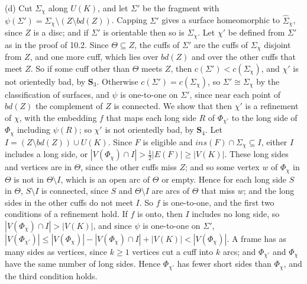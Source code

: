 {(d) Cut $\Sigma_\chi$ along $U(K)$, and let $\Sigma'$ be the fragment with $\psi(\Sigma') = \Sigma_\chi \setminus (Z \setminus bd(Z))$. Capping $\Sigma'$ gives a surface homeomorphic to $\hat{\Sigma}_\chi$, since $Z$ is a disc; and if $\Sigma'$ is orientable then so is $\Sigma_\chi$. Let $\chi'$ be defined from $\Sigma'$ as in the proof of 10.2. Since $\Theta \subseteq Z$, the cuffs of $\Sigma'$ are the cuffs of $\Sigma_\chi$ disjoint from $Z$, and one more cuff, which lies over $bd(Z)$ and over the other cuffs that meet $Z$. So if some cuff other than $\Theta$ meets $Z$, then $c(\Sigma') < c(\Sigma_\chi)$, and $\chi'$ is not orientedly bad, by $\mathbf{S}_3$. Otherwise $c(\Sigma') = c(\Sigma_\chi)$, so $\Sigma' \cong \Sigma_\chi$ by the classification of surfaces, and $\psi$ is one-to-one on $\Sigma'$, since near each point of $bd(Z)$ the complement of $Z$ is connected. We show that then $\chi'$ is a refinement of $\chi$, with the embedding $f$ that maps each long side $R$ of $\Phi_{\chi'}$ to the long side of $\Phi_\chi$ including $\psi(R)$; so $\chi'$ is not orientedly bad, by $\mathbf{S}_4$. Let $I = (Z \setminus bd(Z)) \cup U(K)$. Since $F$ is eligible and $ins(F) \cap \Sigma_\chi \subseteq I$, either $I$ includes a long side, or $|V(\Phi_\chi) \cap I| > \frac{1}{2}|E(F)| \ge |V(K)|$. These long sides and vertices are in $\Theta$, since the other cuffs miss $Z$; and so some vertex $w$ of $\Phi_\chi$ in $\Theta$ is not in $\Theta \setminus I$, which is an open arc of $\Theta$ or empty. Hence for each long side $S$ in $\Theta$, $S \setminus I$ is connected, since $S$ and $\Theta \setminus I$ are arcs of $\Theta$ that miss $w$; and the long sides in the other cuffs do not meet $I$. So $f$ is one-to-one, and the first two conditions of a refinement hold. If $f$ is onto, then $I$ includes no long side, so $|V(\Phi_\chi) \cap I| > |V(K)|$, and since $\psi$ is one-to-one on $\Sigma'$, $|V(\Phi_{\chi'})| \le |V(\Phi_\chi)| - |V(\Phi_\chi) \cap I| + |V(K)| < |V(\Phi_\chi)|$. A frame has as many sides as vertices, since $k \ge 1$ vertices cut a cuff into $k$ arcs; and $\Phi_{\chi'}$ and $\Phi_\chi$ have the same number of long sides. Hence $\Phi_{\chi'}$ has fewer short sides than $\Phi_\chi$, and the third condition holds.

}
